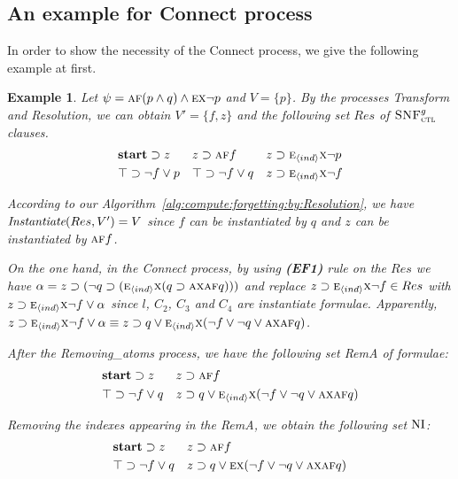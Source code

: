 \documentclass{article}
\newtheorem{example}{Example}
\begin{document}
\subsection{An example for Connect process}
In order to show the necessity of the Connect process, we give the following example at first.
\begin{example}
Let $\psi=\textsc{a}\textsc{f}(p \wedge q) \wedge \textsc{e} \textsc{x} \neg p$ and $V=\{p\}$.
By the processes Transform and Resolution, we can obtain $V'=\{f,z\}$ and the following set $Res$ of ${\textsc{SNF}_{\textsc{ctl}}^g}$ clauses.
\begin{align*}
& \textbf{start} \supset z && z \supset \textsc{a}\textsc{f} f && z \supset  \textsc{e}_{{\langle{ind}\rangle}} \textsc{x} \neg p \\
& \top \supset \neg f \vee p && \top \supset \neg f \vee q && z \supset \textsc{e}_{{\langle{ind}\rangle}} \textsc{x} \neg f
\end{align*}

 According to our Algorithm~\ref{alg:compute:forgetting:by:Resolution}, we have $\emph{Instantiate}(Res,V')=V$ since $f$ can be instantiated by $q$ and $z$ can be instantiated by $\textsc{a}\textsc{f} f$.

On the one hand, in the \emph{Connect} process, by using \textbf{(EF1)} rule on the $Res$ we have $\alpha=z \supset (\neg q \supset  (\textsc{e}_{{\langle{ind}\rangle}}\textsc{x} (q \supset \textsc{a}\textsc{x} \textsc{a}\textsc{f} q )))$ and replace $z \supset \textsc{e}_{{\langle{ind}\rangle}} \textsc{x} \neg f \in Res$ with $z \supset \textsc{e}_{{\langle{ind}\rangle}} \textsc{x} \neg f \vee \alpha$ since $l$, $C_2$, $C_3$ and $C_4$ are instantiate formulae.
Apparently, $z \supset \textsc{e}_{{\langle{ind}\rangle}} \textsc{x} \neg f \vee \alpha \equiv z \supset q \vee \textsc{e}_{{\langle{ind}\rangle}} \textsc{x}(\neg f \vee \neg q \vee \textsc{a}\textsc{x} \textsc{a}\textsc{f} q)$.

After the \emph{Removing\_atoms} process, we have the following set \emph{RemA} of formulae:
\begin{align*}
& \textbf{start} \supset z && z \supset \textsc{a}\textsc{f} f \\
&  \top \supset \neg f \vee q && z \supset q \vee \textsc{e}_{{\langle{ind}\rangle}} \textsc{x}(\neg f \vee \neg q \vee \textsc{a}\textsc{x} \textsc{a}\textsc{f} q)
\end{align*}

Removing the indexes appearing in the \emph{RemA}, we obtain the following set $\textrm{NI}$:
 \begin{align*}
& \textbf{start} \supset z && z \supset \textsc{a}\textsc{f} f \\
&  \top \supset \neg f \vee q && z \supset q \vee \textsc{e} \textsc{x}(\neg f \vee \neg q \vee \textsc{a}\textsc{x} \textsc{a}\textsc{f} q)
\end{align*}


\end{example}
\end{document}
